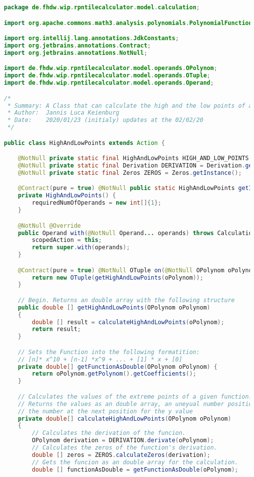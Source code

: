 \begin{lstlisting}[caption=HighAndLowPoints (Keienburg),label=list:HighAndLowPoints,language=Java]
package de.fhdw.wip.rpntilecalculator.model.calculation;

import org.apache.commons.math3.analysis.polynomials.PolynomialFunction;

import org.intellij.lang.annotations.JdkConstants;
import org.jetbrains.annotations.Contract;
import org.jetbrains.annotations.NotNull;

import de.fhdw.wip.rpntilecalculator.model.operands.OPolynom;
import de.fhdw.wip.rpntilecalculator.model.operands.OTuple;
import de.fhdw.wip.rpntilecalculator.model.operands.Operand;

/*
 * Summary: A Class that can calculate the high and the low points of a function( up to third grade)
 * Author:  Jannis Luca Keienburg
 * Date:    2020/01/23 (initialy) updates at the 02/02/20
 */

public class HighAndLowPoints extends Action {

    @NotNull private static final HighAndLowPoints HIGH_AND_LOW_POINTS = new HighAndLowPoints();
    @NotNull private static final Derivation DERIVATION = Derivation.getInstance();
    @NotNull private static final Zeros ZEROS = Zeros.getInstance();

    @Contract(pure = true) @NotNull public static HighAndLowPoints getInstance() { return HIGH_AND_LOW_POINTS; }
    private HighAndLowPoints() {
        requiredNumOfOperands = new int[]{1};
    }

    @NotNull @Override
    public Operand with(@NotNull Operand... operands) throws CalculationException {
        scopedAction = this;
        return super.with(operands);
    }

    @Contract(pure = true) @NotNull OTuple on(@NotNull OPolynom oPolynom) {
        return new OTuple(getHighAndLowPoints(oPolynom));
    }

    // Begin. Returns an double array with the following structure
    public double [] getHighAndLowPoints(OPolynom oPolynom)
    {
        double [] result = calculateHighAndLowPoints(oPolynom);
        return result;
    }

    // Sets the Function into the following formatition:
    // [n]* x^10 + [n-1] *x^9 + ... + [1] * x + [0]
    private double[] getFunctionAsDouble(OPolynom oPolynom) {
        return oPolynom.getPolynom().getCoefficients();
    }

    // Calculates the values of the extreme points of a given function.
    // Returns the values as an double array, an uneyual number position stands for the x value,
    // the number at the next position for the y value
    private double[] calculateHighAndLowPoints(OPolynom oPolynom)
    {
        // Calculates the derivation of the funcion.
        OPolynom derivation = DERIVATION.derivate(oPolynom);
        // Calculates the zeros of the function's derivation.
        double [] zeros = ZEROS.calculateZeros(derivation);
        // Gets the funcion as an double array for the calculation.
        double [] functionAsDouble = getFunctionAsDouble(oPolynom);


\end{lstlisting}
